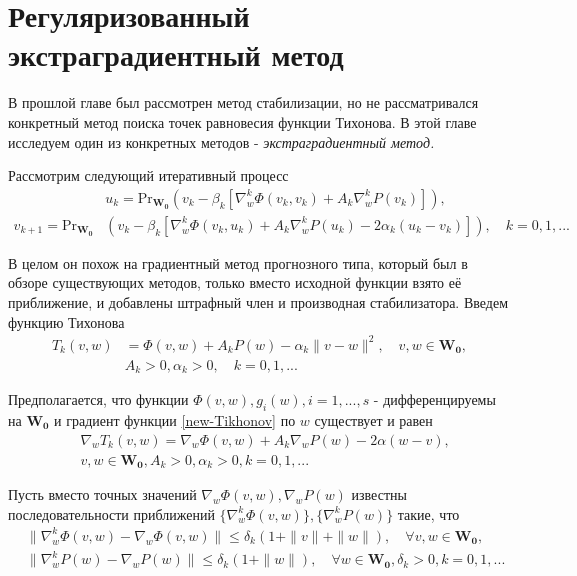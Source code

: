 \section{Регуляризованный экстраградиентный метод}
В прошлой главе был рассмотрен метод стабилизации, но не рассматривался конкретный метод поиска точек равновесия функции Тихонова. В этой главе исследуем один из конкретных методов - \textit{экстраградиентный метод.}

Рассмотрим следующий итеративный процесс
\begin{equation}
\label{[3]-7}
\begin{aligned}
&u_k=\mathrm{Pr}_{\mathbf{W_0}}(v_k-\beta_k[\nabla_w^k\Phi(v_k,v_k)+A_k\nabla_w^kP(v_k)]),\\
v_{k+1}=\mathrm{Pr}_{\mathbf{W_0}}&(v_k-\beta_k[\nabla_w^k\Phi(v_k,u_k)+A_k\nabla_w^kP(u_k)-2\alpha_k(u_k-v_k)]),\quad k=0,1,...
\end{aligned}
\end{equation}

В целом он похож на градиентный метод прогнозного типа, который был в обзоре существующих методов, только вместо исходной функции взято её приближение, и добавлены штрафный член и производная стабилизатора. Введем функцию Тихонова 
\begin{equation}
\label{new-Tikhonov}
\begin{aligned}
T_k(v,w)&=\Phi(v,w)+A_kP(w)-\alpha_k\|v-w\|^2,\quad v,w\in\mathbf{W_0},\\
& A_k>0,\alpha_k>0,\quad k=0,1,...
\end{aligned}
\end{equation}

Предполагается, что функции $\Phi(v,w),g_i(w),i=1,..., s$ - дифференцируемы на $\mathbf{W_0}$ и градиент функции \eqref{new-Tikhonov} по $w$ существует и равен
\begin{equation}
\label{[3]-5}
\begin{aligned}
&\nabla_wT_k(v,w)=\nabla_w\Phi(v,w)+A_k\nabla_wP(w)-2\alpha(w-v),\\
&v,w\in\mathbf{W_0},A_k>0,\alpha_k>0,k=0,1,...
\end{aligned}
\end{equation}

Пусть вместо точных значений $\nabla_w\Phi(v,w),\nabla_wP(w)$ известны последовательности приближений $\{\nabla_w^k\Phi(v,w)\},\{\nabla_w^kP(w)\}$ такие, что
\begin{equation}
\label{[3]-6}
\begin{aligned}
&\|\nabla_w^k\Phi(v,w)-\nabla_w\Phi(v,w)\|\leqslant \delta_k(1+\|v\|+\|w\|),\quad \forall v,w\in \mathbf{W_0},\\
&\|\nabla_w^kP(w)-\nabla_wP(w)\|\leqslant \delta_k(1+\|w\|),\quad\forall w\in \mathbf{W_0},\delta_k>0,k=0,1,... 
\end{aligned}
\end{equation}

